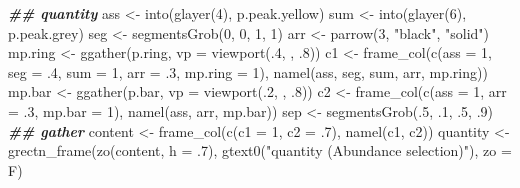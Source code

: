 \documentclass[
]{article}
\newenvironment{Shaded}{\begin{snugshade}}{\end{snugshade}}
\newcommand{\AttributeTok}[1]{\textcolor[rgb]{0.77,0.63,0.00}{#1}}
\newcommand{\DecValTok}[1]{\textcolor[rgb]{0.00,0.00,0.81}{#1}}
\newcommand{\DocumentationTok}[1]{\textcolor[rgb]{0.56,0.35,0.01}{\textbf{\textit{#1}}}}
\newcommand{\FunctionTok}[1]{\textcolor[rgb]{0.00,0.00,0.00}{#1}}
\newcommand{\NormalTok}[1]{#1}
\newcommand{\OtherTok}[1]{\textcolor[rgb]{0.56,0.35,0.01}{#1}}
\newcommand{\StringTok}[1]{\textcolor[rgb]{0.31,0.60,0.02}{#1}}
\begin{document}
\begin{Shaded}
\begin{Highlighting}[]
\DocumentationTok{\#\# quantity}
\NormalTok{ass }\OtherTok{\textless{}{-}} \FunctionTok{into}\NormalTok{(}\FunctionTok{glayer}\NormalTok{(}\DecValTok{4}\NormalTok{), p.peak.yellow)}
\NormalTok{sum }\OtherTok{\textless{}{-}} \FunctionTok{into}\NormalTok{(}\FunctionTok{glayer}\NormalTok{(}\DecValTok{6}\NormalTok{), p.peak.grey)}
\NormalTok{seg }\OtherTok{\textless{}{-}} \FunctionTok{segmentsGrob}\NormalTok{(}\DecValTok{0}\NormalTok{, }\DecValTok{0}\NormalTok{, }\DecValTok{1}\NormalTok{, }\DecValTok{1}\NormalTok{)}
\NormalTok{arr }\OtherTok{\textless{}{-}} \FunctionTok{parrow}\NormalTok{(}\DecValTok{3}\NormalTok{, }\StringTok{"black"}\NormalTok{, }\StringTok{"solid"}\NormalTok{)}
\NormalTok{mp.ring }\OtherTok{\textless{}{-}} \FunctionTok{ggather}\NormalTok{(p.ring, }\AttributeTok{vp =} \FunctionTok{viewport}\NormalTok{(.}\DecValTok{4}\NormalTok{, , .}\DecValTok{8}\NormalTok{))}
\NormalTok{c1 }\OtherTok{\textless{}{-}} \FunctionTok{frame\_col}\NormalTok{(}\FunctionTok{c}\NormalTok{(}\AttributeTok{ass =} \DecValTok{1}\NormalTok{, }\AttributeTok{seg =}\NormalTok{ .}\DecValTok{4}\NormalTok{, }\AttributeTok{sum =} \DecValTok{1}\NormalTok{, }\AttributeTok{arr =}\NormalTok{ .}\DecValTok{3}\NormalTok{, }\AttributeTok{mp.ring =} \DecValTok{1}\NormalTok{),}
                \FunctionTok{namel}\NormalTok{(ass, seg, sum, arr, mp.ring))}
\NormalTok{mp.bar }\OtherTok{\textless{}{-}} \FunctionTok{ggather}\NormalTok{(p.bar, }\AttributeTok{vp =} \FunctionTok{viewport}\NormalTok{(.}\DecValTok{2}\NormalTok{, , .}\DecValTok{8}\NormalTok{))}
\NormalTok{c2 }\OtherTok{\textless{}{-}} \FunctionTok{frame\_col}\NormalTok{(}\FunctionTok{c}\NormalTok{(}\AttributeTok{ass =} \DecValTok{1}\NormalTok{, }\AttributeTok{arr =}\NormalTok{ .}\DecValTok{3}\NormalTok{, }\AttributeTok{mp.bar =} \DecValTok{1}\NormalTok{), }\FunctionTok{namel}\NormalTok{(ass, arr, mp.bar))}
\NormalTok{sep }\OtherTok{\textless{}{-}} \FunctionTok{segmentsGrob}\NormalTok{(.}\DecValTok{5}\NormalTok{, .}\DecValTok{1}\NormalTok{, .}\DecValTok{5}\NormalTok{, .}\DecValTok{9}\NormalTok{)}
\DocumentationTok{\#\# gather}
\NormalTok{content }\OtherTok{\textless{}{-}} \FunctionTok{frame\_col}\NormalTok{(}\FunctionTok{c}\NormalTok{(}\AttributeTok{c1 =} \DecValTok{1}\NormalTok{, }\AttributeTok{c2 =}\NormalTok{ .}\DecValTok{7}\NormalTok{), }\FunctionTok{namel}\NormalTok{(c1, c2))}
\NormalTok{quantity }\OtherTok{\textless{}{-}} \FunctionTok{grectn\_frame}\NormalTok{(}\FunctionTok{zo}\NormalTok{(content, }\AttributeTok{h =}\NormalTok{ .}\DecValTok{7}\NormalTok{), }\FunctionTok{gtext0}\NormalTok{(}\StringTok{"quantity  (Abundance selection)"}\NormalTok{), }\AttributeTok{zo =}\NormalTok{ F)}


\end{Highlighting}
\end{Shaded}
\end{document}
